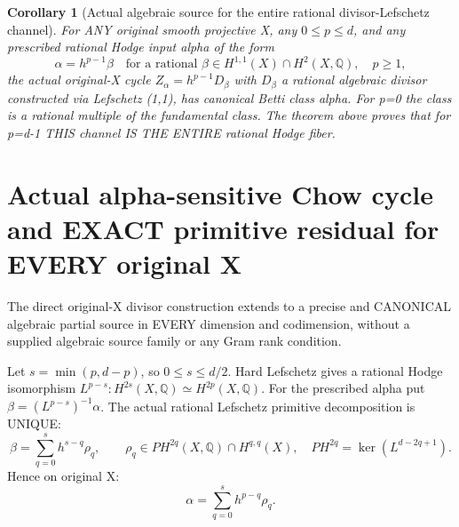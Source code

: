 \documentclass[11pt]{article}
\newtheorem{corollary}[theorem]{Corollary}
\begin{document}
\begin{corollary}[Actual algebraic source for the entire rational divisor-Lefschetz channel]
For ANY original smooth projective X, any
$0\le p\le d$, and any prescribed rational
Hodge input alpha of the form
\[
 \boxed{\alpha=h^{p-1}\beta
 \quad\text{for a rational }\beta\in H^{1,1}(X)
 \cap H^2(X,\mathbb Q),\quad p\ge1,}             \tag{3}
\]
the actual original-X cycle
$Z_\alpha=h^{p-1}D_\beta$
with $D_\beta$ a rational algebraic divisor
constructed via Lefschetz (1,1), has canonical
Betti class alpha. For p=0 the class is a
rational multiple of the fundamental class.
The theorem above proves that for p=d-1
THIS channel IS THE ENTIRE rational Hodge fiber.
\end{corollary}

\section{Actual alpha-sensitive Chow cycle and EXACT primitive residual for EVERY original X}
The direct original-X divisor construction extends to
a precise and CANONICAL algebraic partial source in
EVERY dimension and codimension, without a supplied
algebraic source family or any Gram rank condition.

Let $s=\min(p,d-p)$, so $0\le s\le d/2$.
Hard Lefschetz gives a rational Hodge isomorphism
$L^{p-s}:H^{2s}(X,\mathbb Q)\simeq
  H^{2p}(X,\mathbb Q)$.
For the prescribed alpha put
$\beta=(L^{p-s})^{-1}\alpha$.
The actual rational Lefschetz primitive
decomposition is UNIQUE:
\[
 \boxed{
 \beta=\sum_{q=0}^{s}h^{s-q}\rho_q,\qquad
 \rho_q\in PH^{2q}(X,\mathbb Q)
      \cap H^{q,q}(X),\quad
 PH^{2q}=\ker(L^{d-2q+1}).
 }                                                       \tag{14}
\]
Hence on original X:
\[
 \boxed{
 \alpha=\sum_{q=0}^{s}h^{p-q}\rho_q.
 }                                                       \tag{15}
\]
\end{document}
